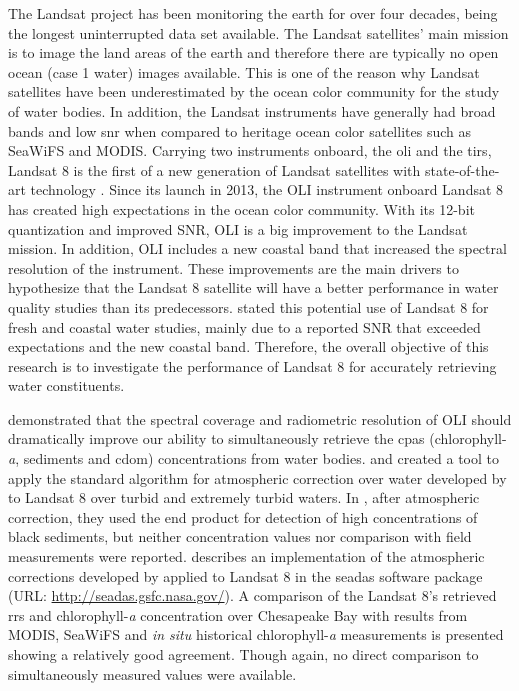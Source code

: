The Landsat project has been monitoring the earth for over four decades, being the longest uninterrupted data set available. The Landsat satellites' main mission is to image the land areas of the earth and therefore there are typically no open ocean (case 1 water) images available. This is one of the reason why Landsat satellites have been underestimated by the ocean color community for the study of water bodies. In addition, the Landsat instruments have generally had broad bands and low \acrfull{snr} when compared to heritage ocean color satellites such as SeaWiFS and MODIS. Carrying two instruments onboard, the \acrfull{oli} and the \acrfull{tirs}, Landsat 8 is the first of a new generation of Landsat satellites with state-of-the-art technology \cite{Irons:2012}. Since its launch in 2013, the OLI instrument onboard Landsat 8 has created high expectations in the ocean color community. With its 12-bit quantization and improved SNR, OLI is a big improvement to the Landsat mission. In addition, OLI includes a new coastal band that increased the spectral resolution of the instrument. These improvements are the main drivers to hypothesize that the Landsat 8 satellite will have a better performance in water quality studies than its predecessors. \cite{Roy:2014} stated this potential use of Landsat 8 for fresh and coastal water studies, mainly due to a reported SNR that exceeded expectations and the new coastal band. Therefore, the overall objective of this research is to investigate the performance of Landsat 8 for accurately retrieving water constituents.

\cite{Gerace:2013} demonstrated that the spectral coverage and radiometric resolution of OLI should dramatically improve our ability to simultaneously retrieve the \acrfull{cpas} (chlorophyll-{\it a}, sediments and \acrfull{cdom}) concentrations from water bodies. \cite{Vanhellemont2014} and \cite{Vanhellemont:2015} created a tool to apply the standard algorithm for atmospheric correction over water developed by \cite{Gordon:1994} to Landsat 8 over turbid and extremely turbid waters. In \cite{Vanhellemont:2015}, after atmospheric correction, they used the end product for detection of high concentrations of black sediments, but neither concentration values nor comparison with field measurements were reported. \cite{Franz:2015} describes an implementation of the atmospheric corrections developed by \cite{Gordon:1994} applied to Landsat 8 in the \acrfull{seadas} software package (URL: \url{http://seadas.gsfc.nasa.gov/}). A comparison of the Landsat 8's retrieved \acrfull{rrs} and chlorophyll-{\it a} concentration over Chesapeake Bay with results from MODIS, SeaWiFS and {\it in situ} historical chlorophyll-{\it a} measurements is presented showing a relatively good agreement. Though again, no direct comparison to simultaneously measured values were available.

